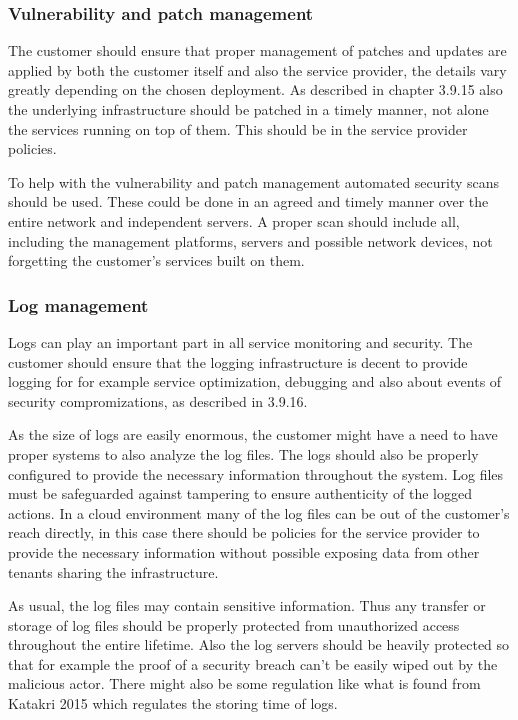 \documentclass{article}
\begin{document}
\subsubsection{Vulnerability and patch management}
The customer should ensure that proper management of patches and updates are applied by both the customer itself and also the service provider, the details vary greatly depending on the chosen deployment. As described in chapter 3.9.15 also the underlying infrastructure should be patched in a timely manner, not alone the services running on top of them. This should be in the service provider policies.
\par
To help with the vulnerability and patch management automated security scans should be used. These could be done in an agreed and timely manner over the entire network and independent servers. A proper scan should include all, including the management platforms, servers and possible network devices, not forgetting the customer's services built on them.

\subsubsection{Log management}
Logs can play an important part in all service monitoring and security. The customer should ensure that the logging infrastructure is decent to provide logging for for example service optimization, debugging and also about events of security compromizations, as described in 3.9.16.
\par
As the size of logs are easily enormous, the customer might have a need to have proper systems to also analyze the log files. The logs should also be properly configured to provide the necessary information throughout the system. Log files must be safeguarded against tampering to ensure authenticity of the logged actions. In a cloud environment many of the log files can be out of the customer's reach directly, in this case there should be policies for the service provider to provide the necessary information without possible exposing data from other tenants sharing the infrastructure.
\par
As usual, the log files may contain sensitive information. Thus any transfer or storage of log files should be properly protected from unauthorized access throughout the entire lifetime. Also the log servers should be heavily protected so that for example the proof of a security breach can't be easily wiped out by the malicious actor. There might also be some regulation like what is found from Katakri 2015 which regulates the storing time of logs.
\end{document}
